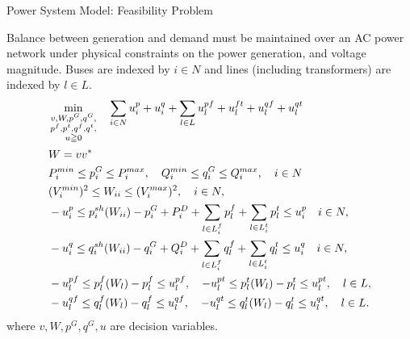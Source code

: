 \documentclass[xcolor=dvipsnames]{beamer}
\newcommand{\p}[1]{p^{#1}}
\newcommand{\q}[1]{q^{#1}}
\newcommand{\ii}{i}
\newcommand{\llll}{l}
\newcommand{\from}{f}
\newcommand{\tto}{t}
\newcommand{\WW}{W}
\newcommand{\Lines}{L}
\begin{document}
\begin{frame}{Power System Model: Feasibility Problem}
\begin{footnotesize}
Balance between generation and demand must be maintained over an AC power network under physical constraints on the power generation, and voltage magnitude.
Buses are indexed by $i \in N$ and lines (including transformers) are indexed by $l \in L$.
\begin{subequations}
\begin{align}
&\min_{\substack{v,W,p^G,q^G,\\ p^f,p^t,q^f,q^t,\\ u \geqq 0}} \quad 
  \sum_{i \in N} u_i^p + u_i^q + \sum_{l \in L} u_l^{pf} + u_l^{ft} + u_l^{qf} + u_l^{qt}  \notag \\
  & W = v v^* \notag\\
  & P_i^{min} \leq p_i^G \leq P_i^{max}, \quad Q_i^{min} \leq q_i^G \leq Q_i^{max}, \quad i\in N \notag \\
  & (V_i^{min})^2 \leq W_{ii} \leq (V_i^{max})^2,\quad i\in N, \notag \\
  & -u_i^p \le p_i^{sh}(\WW_{ii}) - p^G_i + P^D_i 
	+ \sum_{\llll \in \Lines_\ii^{\from} } p_{l}^{f}  
	+\sum_{\llll \in \Lines_\ii^{\tto}   } p_{l}^{t} 
	\le u_i^p \quad i\in N, \notag\\ 
  & -u_i^q \le q_i^{sh}(\WW_{ii}) - q^G_i + Q^D_i 
	+ \sum_{\llll \in \Lines_\ii^{\from}} q_{l}^{f}
	+ \sum_{\llll \in \Lines_\ii^{\tto} } q_{l}^{t} 
	\le u_i^q \quad i\in N, \notag \\
& -u_l^{pf} \le \p{\from}_{\llll}(\WW_\llll) - p_{l}^{f} \le u_l^{pf}, \quad
 -u_l^{pt} \le \p{\tto}_{\llll}(\WW_\llll)  - p_{l}^{t} \le u_l^{pt}, \quad \llll \in L, \notag \\
& -u_l^{qf} \le \q{\from}_{\llll}(\WW_\llll) - q_{l}^{f} \le u_l^{qf}, \quad 
 -u_l^{qt} \le \q{\tto}_{\llll}(\WW_\llll)  - q_{l}^{t} \le u_l^{qt}, \quad \llll \in L. \notag 
\end{align}
\end{subequations}
where $v,W,p^G,q^G,u$ are decision variables. 
\end{footnotesize}
\end{frame}
\end{document}
